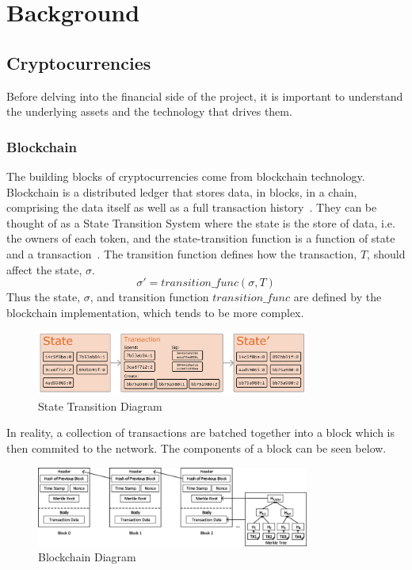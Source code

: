 \chapter{Background}
\section{Cryptocurrencies}
Before delving into the financial side of the project, it is important to understand the underlying assets and the technology that drives them.

\subsection{Blockchain}
The building blocks of cryptocurrencies come from blockchain technology. Blockchain is a distributed ledger that stores data, in blocks, in a chain, comprising the data itself as well as a full transaction history~\cite{nofer2017blockchain}. They can be thought of as a State Transition System where the state is the store of data, i.e. the owners of each token, and the state-transition function is a function of state and a transaction~\cite{ethereum_whitepaper}. The transition function defines how the transaction, $T$, should affect the state, $\sigma$. $$\sigma' = transition\_func(\sigma, T)$$Thus the state, $\sigma$, and transition function $transition\_func$ are defined by the blockchain implementation, which tends to be more complex.

\begin{figure}[!htb]
    \centering
    \includegraphics[width=0.8\textwidth]{background/Images/ethereum-state-transition.png}
    \caption{State Transition Diagram~\cite{ethereum_whitepaper}}
\end{figure}

\noindent In reality, a collection of transactions are batched together into a block which is then commited to the network. The components of a block can be seen below.

\begin{figure}[!htb]
    \centering
    \includegraphics[width=0.8\textwidth]{background/Images/The-structure-of-a-Blockchain.png}
    \caption{Blockchain Diagram~\cite{inbookBlockchain}}
\end{figure}

